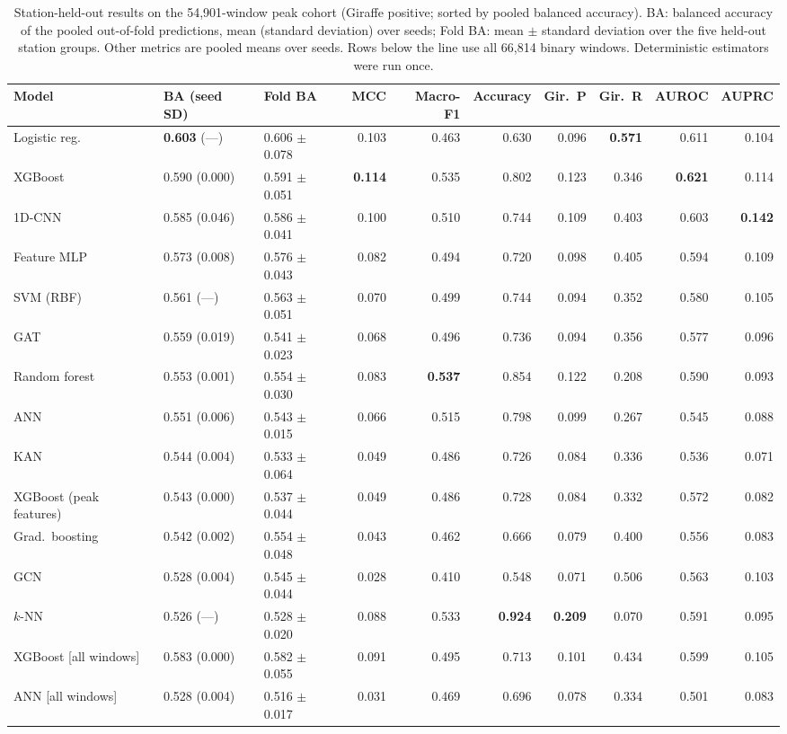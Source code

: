 \documentclass[a4paper,fleqn]{cas-dc}
\begin{document}
\begin{table}[width=.98\textwidth,cols=11,pos=t]
\caption{Station-held-out results on the 54,901-window peak cohort (Giraffe positive;
sorted by pooled balanced accuracy). BA: balanced accuracy of the pooled out-of-fold
predictions, mean (standard deviation) over seeds; Fold BA: mean $\pm$ standard deviation
over the five held-out station groups. Other metrics are pooled means over seeds. Rows
below the line use all 66,814 binary windows. Deterministic estimators were run once.}
\label{tbl:main}
\footnotesize
\begin{tabular*}{\tblwidth}{@{}l@{\extracolsep{\fill}}llrrrrrrr@{}}
\toprule
Model & BA (seed SD) & Fold BA & MCC & Macro-F1 & Accuracy & Gir.\ P & Gir.\ R & AUROC & AUPRC \\
\midrule
Logistic reg. & \textbf{0.603} (---) & 0.606 $\pm$ 0.078 & 0.103 & 0.463 & 0.630 & 0.096 & \textbf{0.571} & 0.611 & 0.104 \\
XGBoost & 0.590 (0.000) & 0.591 $\pm$ 0.051 & \textbf{0.114} & 0.535 & 0.802 & 0.123 & 0.346 & \textbf{0.621} & 0.114 \\
1D-CNN & 0.585 (0.046) & 0.586 $\pm$ 0.041 & 0.100 & 0.510 & 0.744 & 0.109 & 0.403 & 0.603 & \textbf{0.142} \\
Feature MLP & 0.573 (0.008) & 0.576 $\pm$ 0.043 & 0.082 & 0.494 & 0.720 & 0.098 & 0.405 & 0.594 & 0.109 \\
SVM (RBF) & 0.561 (---) & 0.563 $\pm$ 0.051 & 0.070 & 0.499 & 0.744 & 0.094 & 0.352 & 0.580 & 0.105 \\
GAT & 0.559 (0.019) & 0.541 $\pm$ 0.023 & 0.068 & 0.496 & 0.736 & 0.094 & 0.356 & 0.577 & 0.096 \\
Random forest & 0.553 (0.001) & 0.554 $\pm$ 0.030 & 0.083 & \textbf{0.537} & 0.854 & 0.122 & 0.208 & 0.590 & 0.093 \\
ANN & 0.551 (0.006) & 0.543 $\pm$ 0.015 & 0.066 & 0.515 & 0.798 & 0.099 & 0.267 & 0.545 & 0.088 \\
KAN & 0.544 (0.004) & 0.533 $\pm$ 0.064 & 0.049 & 0.486 & 0.726 & 0.084 & 0.336 & 0.536 & 0.071 \\
XGBoost (peak features) & 0.543 (0.000) & 0.537 $\pm$ 0.044 & 0.049 & 0.486 & 0.728 & 0.084 & 0.332 & 0.572 & 0.082 \\
Grad.\ boosting & 0.542 (0.002) & 0.554 $\pm$ 0.048 & 0.043 & 0.462 & 0.666 & 0.079 & 0.400 & 0.556 & 0.083 \\
GCN & 0.528 (0.004) & 0.545 $\pm$ 0.044 & 0.028 & 0.410 & 0.548 & 0.071 & 0.506 & 0.563 & 0.103 \\
$k$-NN & 0.526 (---) & 0.528 $\pm$ 0.020 & 0.088 & 0.533 & \textbf{0.924} & \textbf{0.209} & 0.070 & 0.591 & 0.095 \\
\midrule
XGBoost [all windows] & 0.583 (0.000) & 0.582 $\pm$ 0.055 & 0.091 & 0.495 & 0.713 & 0.101 & 0.434 & 0.599 & 0.105 \\
ANN [all windows] & 0.528 (0.004) & 0.516 $\pm$ 0.017 & 0.031 & 0.469 & 0.696 & 0.078 & 0.334 & 0.501 & 0.083 \\
\bottomrule
\end{tabular*}
\end{table}
\end{document}
